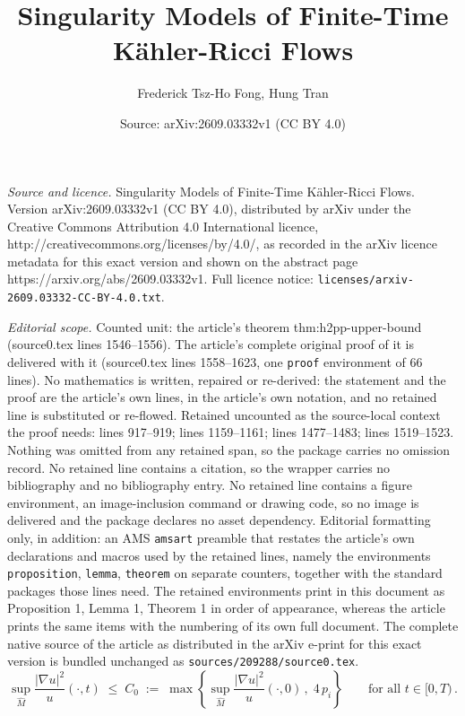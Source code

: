 \documentclass[10pt,a4paper]{amsart}
\title{Singularity Models of Finite-Time K\"ahler-Ricci Flows}
\author{Frederick Tsz-Ho Fong, Hung Tran}
\date{Source: arXiv:2609.03332v1 (CC BY 4.0)}
\begin{document}
\maketitle

\noindent\emph{Source and licence.} Singularity Models of Finite-Time K\"ahler-Ricci Flows. Version arXiv:2609.03332v1 (CC BY 4.0), distributed by arXiv under the Creative Commons Attribution 4.0 International licence, http://creativecommons.org/licenses/by/4.0/, as recorded in the arXiv licence metadata for this exact version and shown on the abstract page https://arxiv.org/abs/2609.03332v1. Full licence notice: \texttt{licenses/arxiv-2609.03332-CC-BY-4.0.txt}.\par\smallskip

\noindent\textit{Editorial scope.} Counted unit: the article's theorem thm:h2pp-upper-bound (source0.tex lines 1546--1556). The article's complete original proof of it is delivered with it (source0.tex lines 1558--1623, one \texttt{proof} environment of 66 lines). No mathematics is written, repaired or re-derived: the statement and the proof are the article's own lines, in the article's own notation, and no retained line is substituted or re-flowed.  Retained uncounted as the source-local context the proof needs: lines 917--919; lines 1159--1161; lines 1477--1483; lines 1519--1523.  Nothing was omitted from any retained span, so the package carries no omission record.  No retained line contains a citation, so the wrapper carries no bibliography and no bibliography entry.  No retained line contains a figure environment, an image-inclusion command or drawing code, so no image is delivered and the package declares no asset dependency.  Editorial formatting only, in addition: an AMS \texttt{amsart} preamble that restates the article's own declarations and macros used by the retained lines, namely the environments \texttt{proposition}, \texttt{lemma}, \texttt{theorem} on separate counters, together with the standard packages those lines need.  The retained environments print in this document as Proposition 1, Lemma 1, Theorem 1 in order of appearance, whereas the article prints the same items with the numbering of its own full document.  The complete native source of the article as distributed in the arXiv e-print for this exact version is bundled unchanged as \texttt{sources/209288/source0.tex}.
		\begin{equation}\label{eq:li-yau}
		\sup_{\widehat{M}} \frac{| \nabla u |^2}{u} (\cdot, t) \;\leq\; C_0 \;:=\; \max \left\{ \sup_{\widehat{M}} \frac{| \nabla u |^2}{u} (\cdot, 0) \,, \; 4\, p_i \right\} \qquad \text{for all } t \in [0, T) \,.
	\end{equation}
\end{document}
